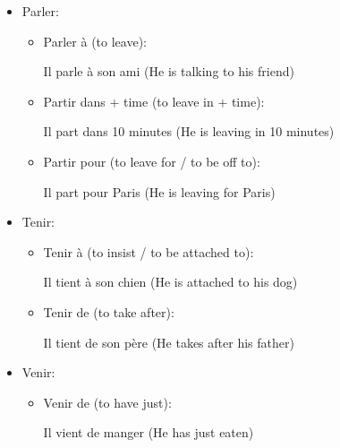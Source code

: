 \documentclass{book}
\begin{document}
\begin{itemize}
            \item Parler:
                \begin{itemize}
                    \item Parler à (to leave): 
                        \begin{center}
                            Il parle à son ami (He is talking to his friend)
                        \end{center}    
                    
                    \item Partir dans + time (to leave in + time):
                        \begin{center}
                            Il part dans 10 minutes (He is leaving in 10 minutes)
                        \end{center}
                    
                    \item Partir pour (to leave for / to be off to):
                        \begin{center}
                            Il part pour Paris (He is leaving for Paris)
                        \end{center}
                \end{itemize}

            \item Tenir:
                \begin{itemize}
                    \item Tenir à (to insist / to be attached to):
                        \begin{center}
                            Il tient à son chien (He is attached to his dog)
                        \end{center}
                    
                    \item Tenir de (to take after):
                        \begin{center}
                            Il tient de son père (He takes after his father)
                        \end{center}
                \end{itemize}
            
            \item Venir:
                \begin{itemize}
                    \item Venir de (to have just):
                        \begin{center}
                            Il vient de manger (He has just eaten)
                        \end{center}
                    

\end{itemize}
\end{itemize}
\end{document}
